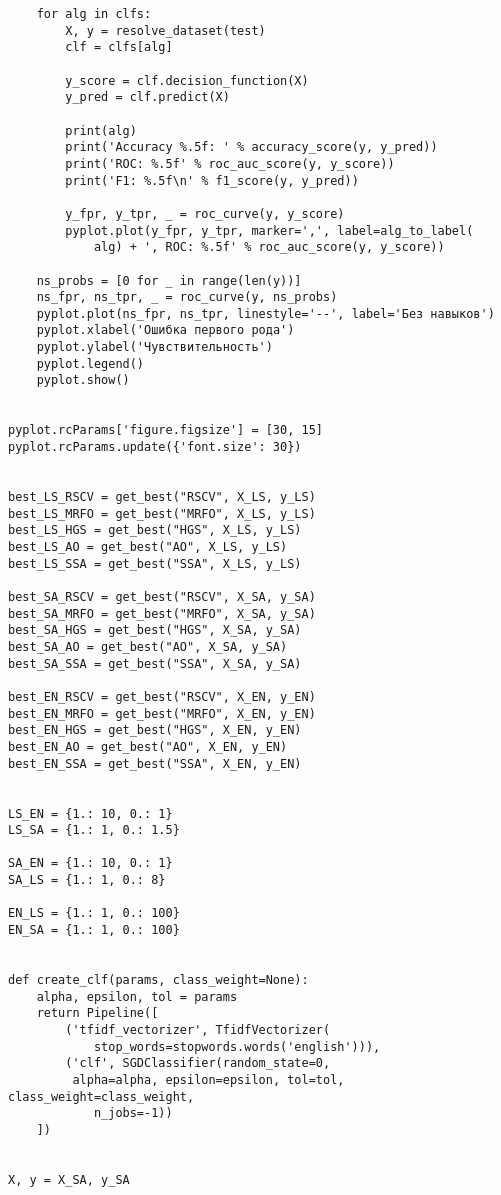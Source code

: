 \begin{lstlisting}
    for alg in clfs:
        X, y = resolve_dataset(test)
        clf = clfs[alg]

        y_score = clf.decision_function(X)
        y_pred = clf.predict(X)

        print(alg)
        print('Accuracy %.5f: ' % accuracy_score(y, y_pred))
        print('ROC: %.5f' % roc_auc_score(y, y_score))
        print('F1: %.5f\n' % f1_score(y, y_pred))

        y_fpr, y_tpr, _ = roc_curve(y, y_score)
        pyplot.plot(y_fpr, y_tpr, marker=',', label=alg_to_label(
            alg) + ', ROC: %.5f' % roc_auc_score(y, y_score))

    ns_probs = [0 for _ in range(len(y))]
    ns_fpr, ns_tpr, _ = roc_curve(y, ns_probs)
    pyplot.plot(ns_fpr, ns_tpr, linestyle='--', label='Без навыков')
    pyplot.xlabel('Ошибка первого рода')
    pyplot.ylabel('Чувствительность')
    pyplot.legend()
    pyplot.show()


pyplot.rcParams['figure.figsize'] = [30, 15]
pyplot.rcParams.update({'font.size': 30})


best_LS_RSCV = get_best("RSCV", X_LS, y_LS)
best_LS_MRFO = get_best("MRFO", X_LS, y_LS)
best_LS_HGS = get_best("HGS", X_LS, y_LS)
best_LS_AO = get_best("AO", X_LS, y_LS)
best_LS_SSA = get_best("SSA", X_LS, y_LS)

best_SA_RSCV = get_best("RSCV", X_SA, y_SA)
best_SA_MRFO = get_best("MRFO", X_SA, y_SA)
best_SA_HGS = get_best("HGS", X_SA, y_SA)
best_SA_AO = get_best("AO", X_SA, y_SA)
best_SA_SSA = get_best("SSA", X_SA, y_SA)

best_EN_RSCV = get_best("RSCV", X_EN, y_EN)
best_EN_MRFO = get_best("MRFO", X_EN, y_EN)
best_EN_HGS = get_best("HGS", X_EN, y_EN)
best_EN_AO = get_best("AO", X_EN, y_EN)
best_EN_SSA = get_best("SSA", X_EN, y_EN)


LS_EN = {1.: 10, 0.: 1}
LS_SA = {1.: 1, 0.: 1.5}

SA_EN = {1.: 10, 0.: 1}
SA_LS = {1.: 1, 0.: 8}

EN_LS = {1.: 1, 0.: 100}
EN_SA = {1.: 1, 0.: 100}


def create_clf(params, class_weight=None):
    alpha, epsilon, tol = params
    return Pipeline([
        ('tfidf_vectorizer', TfidfVectorizer(
            stop_words=stopwords.words('english'))),
        ('clf', SGDClassifier(random_state=0,
         alpha=alpha, epsilon=epsilon, tol=tol, class_weight=class_weight,
            n_jobs=-1))
    ])


X, y = X_SA, y_SA


\end{lstlisting}
